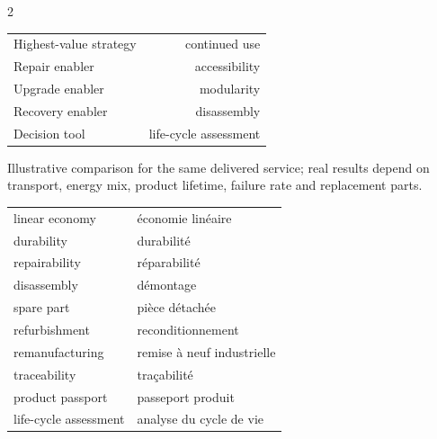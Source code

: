 \begin{multicols}{2}
\begin{keyfigures}
\begin{tabularx}{\linewidth}{@{}Xr@{}}
Highest-value strategy & continued use\\
Repair enabler & accessibility\\
Upgrade enabler & modularity\\
Recovery enabler & disassembly\\
Decision tool & life-cycle assessment
\end{tabularx}
\end{keyfigures}

\begin{tcolorbox}[title=\sffamily\bfseries Relative life-cycle impact,colback=white,colframe=ECRed]
\begin{center}
\end{center}
\footnotesize Illustrative comparison for the same delivered service; real results depend on
transport, energy mix, product lifetime, failure rate and replacement parts.
\end{tcolorbox}

\begin{vocabulary}
\begin{tabularx}{\linewidth}{@{}lX@{}}
linear economy & économie linéaire\\
durability & durabilité\\
repairability & réparabilité\\
disassembly & démontage\\
spare part & pièce détachée\\
refurbishment & reconditionnement\\
remanufacturing & remise à neuf industrielle\\
traceability & traçabilité\\
product passport & passeport produit\\
life-cycle assessment & analyse du cycle de vie
\end{tabularx}
\end{vocabulary}


\end{multicols}
